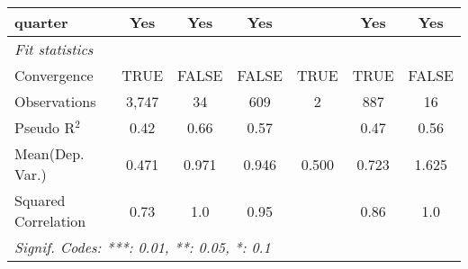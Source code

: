 \begin{tabular}{lcccccc}
   quarter                                                    & Yes           & Yes          & Yes          &      & Yes           & Yes\\  
   \midrule
   \emph{Fit statistics}\\
   Convergence                                                &TRUE           & FALSE        & FALSE        & TRUE & TRUE          & FALSE\\  
   Observations                                               & 3,747         & 34           & 609          & 2    & 887           & 16\\  
   Pseudo R$^2$                                               & 0.42          & 0.66         & 0.57         &      & 0.47          & 0.56\\  
Mean(Dep. Var.) & 0.471 & 0.971 & 0.946 & 0.500 & 0.723 & 1.625 \\
   Squared Correlation                                        & 0.73          & 1.0          & 0.95         &      & 0.86          & 1.0\\  
   \midrule \midrule
   \multicolumn{7}{l}{\emph{Signif. Codes: ***: 0.01, **: 0.05, *: 0.1}}\\
\end{tabular}
\par\endgroup
